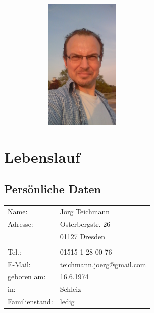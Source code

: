 \documentclass{article}
\begin{document}

\begin{figure}
    \includegraphics[width=1.5in, height=2.5in]{Image.jpeg}

\end{figure}

\section*{Lebenslauf}

\subsection*{Pers\"onliche Daten}
\begin{tabular}{lp{15cm}}
Name: 		& J\"org Teichmann\\
Adresse: 	& Osterbergstr. 26\\
	 		& 01127 Dresden\\
\\
Tel.:		& 01515 1 28 00 76 \\
E-Mail:  	& teichmann.joerg@gmail.com \\
geboren am: & 16.6.1974\\
in:	    	& Schleiz\\
Familienstand: 	& ledig
\end{tabular}
\end{document}
